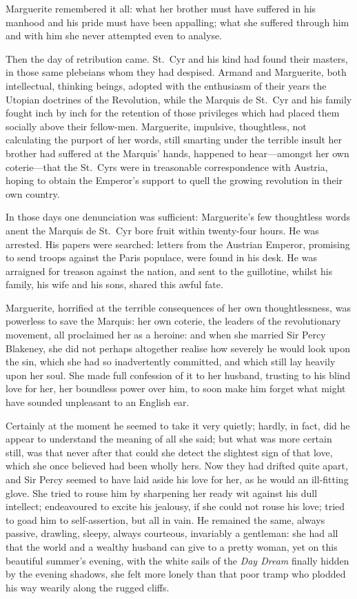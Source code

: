 \documentclass[paper=a5,BCOR=7mm,twoside,DIV=calc,12pt,usegeometry,chapterprefix,endperiod,headings=big]{scrbook}
\begin{document}
Marguerite remembered it all: what her brother must have suffered in his manhood and his pride must have been appalling; what she suffered through him and with him she never attempted even to analyse.

Then the day of retribution came. St.~Cyr and his kind had found their masters, in those same plebeians whom they had despised. Armand and Marguerite, both intellectual, thinking beings, adopted with the enthusiasm of their years the Utopian doctrines of the Revolution, while the Marquis de St.~Cyr and his family fought inch by inch for the retention of those privileges which had placed them socially above their fellow-men. Marguerite, impulsive, thoughtless, not calculating the purport of her words, still smarting under the terrible insult her brother had suffered at the Marquis’ hands, happened to hear---amongst her own coterie---that the St.~Cyrs were in treasonable correspondence with Austria, hoping to obtain the Emperor's support to quell the growing revolution in their own country.

In those days one denunciation was sufficient: Marguerite's few thoughtless words anent the Marquis de St.~Cyr bore fruit within twenty-four hours. He was arrested. His papers were searched: letters from the Austrian Emperor, promising to send troops against the Paris populace, were found in his desk. He was arraigned for treason against the nation, and sent to the guillotine, whilst his family, his wife and his sons, shared this awful fate.

Marguerite, horrified at the terrible consequences of her own thoughtlessness, was powerless to save the Marquis: her own coterie, the leaders of the revolutionary movement, all proclaimed her as a heroine: and when she married Sir Percy Blakeney, she did not perhaps altogether realise how severely he would look upon the sin, which she had so inadvertently committed, and which still lay heavily upon her soul. She made full confession of it to her husband, trusting to his blind love for her, her boundless power over him, to soon make him forget what might have sounded unpleasant to an English ear.

Certainly at the moment he seemed to take it very quietly; hardly, in fact, did he appear to understand the meaning of all she said; but what was more certain still, was that never after that could she detect the slightest sign of that love, which she once believed had been wholly hers. Now they had drifted quite apart, and Sir Percy seemed to have laid aside his love for her, as he would an ill-fitting glove. She tried to rouse him by sharpening her ready wit against his dull intellect; endeavoured to excite his jealousy, if she could not rouse his love; tried to goad him to self-assertion, but all in vain. He remained the same, always passive, drawling, sleepy, always courteous, invariably a gentleman: she had all that the world and a wealthy husband can give to a pretty woman, yet on this beautiful summer's evening, with the white sails of the \textit{Day Dream} finally hidden by the evening shadows, she felt more lonely than that poor tramp who plodded his way wearily along the rugged cliffs.
\end{document}
